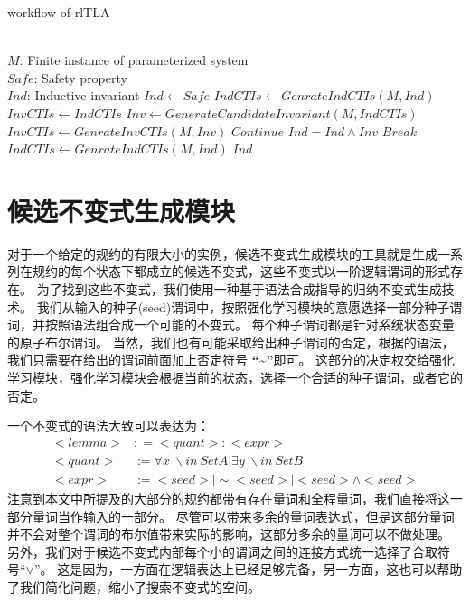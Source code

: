 \begin{algorithm}
    \caption[short]{workflow of rlTLA}
    \label{alg:rltla-workflow}
    
    \begin{algorithmic}[1]
        \REQUIRE \ \\
        $M$: Finite instance of parameterized system\\
        $Safe$: Safety property
		\ENSURE \ \\
        $Ind$: Inductive invariant
		\STATE $Ind \gets Safe$
        \STATE $IndCTIs \gets GenrateIndCTIs(M, Ind)$
            \STATE $InvCTIs \gets IndCTIs$
                \STATE $Inv \gets GenerateCandidateInvariant(M, IndCTIs)$
                \STATE $InvCTIs \gets GenrateInvCTIs(M, Inv)$
                    \STATE $Continue$
                \ENDIF
                    \STATE $Ind = Ind \wedge Inv$
                    \STATE $Break$
                \ENDIF
            \ENDWHILE
            \STATE $IndCTIs \gets GenrateIndCTIs(M, Ind)$
        \ENDWHILE
        \RETURN $Ind$
    \end{algorithmic}
\end{algorithm}

\section{候选不变式生成模块}

对于一个给定的规约的有限大小的实例，候选不变式生成模块的工具就是生成一系列在规约的每个状态下都成立的候选不变式，这些不变式以一阶逻辑谓词的形式存在。
为了找到这些不变式，我们使用一种基于语法合成指导的归纳不变式生成技术。
我们从输入的种子(seed)谓词中，按照强化学习模块的意愿选择一部分种子谓词，并按照语法组合成一个可能的不变式。
每个种子谓词都是针对系统状态变量的原子布尔谓词。
当然，我们也有可能采取给出种子谓词的否定，根据\TLA 的语法，我们只需要在给出的谓词前面加上否定符号 \textbf{“\~{}”}即可。
这部分的决定权交给强化学习模块，强化学习模块会根据当前的状态，选择一个合适的种子谓词，或者它的否定。

一个不变式的语法大致可以表达为：
\begin{align}
    <lemma> &: = <quant>:<expr>   \\
    <quant> &:= \forall x\ \backslash in\ SetA | \exists y\ \backslash in\ SetB \\
    <expr>  &:= <seed>| \sim<seed> | <seed> \wedge <seed>
\end{align}
注意到本文中所提及的大部分的\TLA 规约都带有存在量词和全程量词，我们直接将这一部分量词当作输入的一部分。
尽管可以带来多余的量词表达式，但是这部分量词并不会对整个谓词的布尔值带来实际的影响，这部分多余的量词可以不做处理。
另外，我们对于候选不变式内部每个小的谓词之间的连接方式统一选择了合取符号“$\vee$”。
这是因为，一方面在逻辑表达上已经足够完备\cite{or-complete}，另一方面，这也可以帮助了我们简化问题，缩小了搜索不变式的空间。


